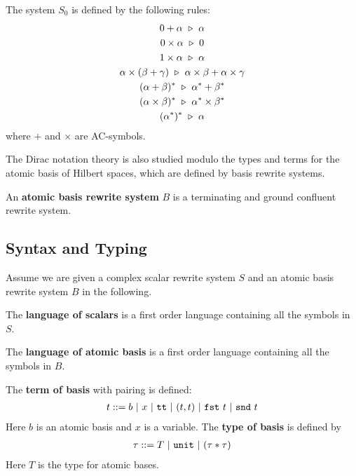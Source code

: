 \begin{definition}
  The system $S_0$ is defined by the following rules:
  \begin{gather*}
    0 + \alpha \ \triangleright\  \alpha\\
    0 \times \alpha \ \triangleright\  0\\
    1 \times \alpha \ \triangleright\  \alpha\\
    \alpha \times (\beta + \gamma) \ \triangleright\  \alpha \times \beta + \alpha \times \gamma\\
    (\alpha + \beta)^* \ \triangleright\  \alpha^* + \beta^*\\
    (\alpha \times \beta)^* \ \triangleright\  \alpha^* \times \beta^*\\
    (\alpha^*)^* \ \triangleright\  \alpha
  \end{gather*}
  where $+$ and $\times$ are AC-symbols.
\end{definition}

The Dirac notation theory is also studied modulo the types and terms for the atomic basis of Hilbert spaces, which are defined by basis rewrite systems.

\begin{definition}
  An \textbf{atomic basis rewrite system} $B$ is a terminating and ground confluent rewrite system.
\end{definition}

\subsection{Syntax and Typing}

Assume we are given a complex scalar rewrite system $S$ and an atomic basis rewrite system $B$ in the following.

\begin{definition}
  The \textbf{language of scalars} is a first order language containing all the symbols in $S$.
\end{definition}


\begin{definition}
  The \textbf{language of atomic basis} is a first order language containing all the symbols in $B$.
\end{definition}


\begin{definition}
  The \textbf{term of basis} with pairing is defined:
  \begin{align*}
    t ::= b\ |\ x\ |\ \texttt{tt}\ |\ (t, t)\ |\ \texttt{fst}\ t\ |\ \texttt{snd}\ t
  \end{align*}
  Here $b$ is an atomic basis and $x$ is a variable. The \textbf{type of basis} is defined by
  \begin{align*}
    \tau ::= T\ |\ \texttt{unit}\ |\ (\tau * \tau)
  \end{align*}
  Here $T$ is the type for atomic bases.
\end{definition}

